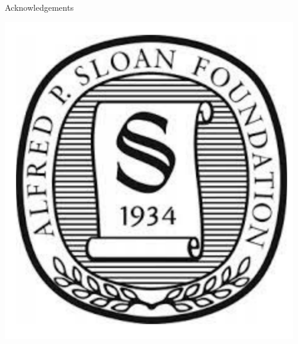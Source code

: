 \documentclass[final]{beamer}
\newlength{\sepwid}
\newlength{\colonewid}
\begin{document}
\begin{frame}[t]
\begin{columns}[t]
\begin{column}{\colonewid}
\begin{block}{Acknowledgements}
\begin{center}
          \hspace{5ex}\includegraphics[height=0.18\colonewid]{sloan}
        \end{center}
      \end{block}
    \end{column} %

    \begin{column}{\sepwid}\end{column} %


\end{columns}
\end{frame}
\end{document}
